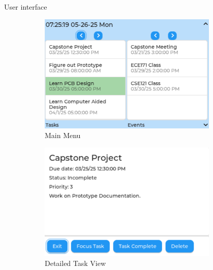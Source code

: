 \documentclass[final]{beamer}
\newlength{\sepwidth}
\newlength{\colwidth}
\newlength{\bigcolwidth}
\newcommand{\separatorcolumn}{\begin{column}{\sepwidth}\end{column}}
\begin{document}
\begin{frame}[t]
  \begin{columns}
      \separatorcolumn
      \begin{column}{\bigcolwidth}
  \vspace{-1.5cm}
    \begin{block}{User interface}
        \begin{figure}
          \centering
          \begin{subfigure}{0.24\textwidth}
            \includegraphics[width=\textwidth]{taskEvent.png}
            \caption{Main Menu}
          \end{subfigure}
          \hfill
          \begin{subfigure}{0.24\textwidth}
            \includegraphics[width=\textwidth]{taskTile.png}
            \caption{Detailed Task View}
          \end{subfigure}
          \hfill
          \begin{subfigure}{0.24\textwidth}

\end{subfigure}
\end{figure}
\end{block}
\end{column}
\end{columns}
\end{frame}
\end{document}
